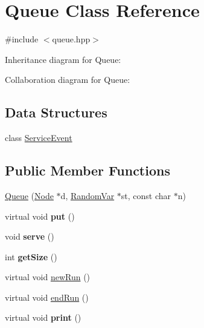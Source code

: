 \hypertarget{classQueue}{}\section{Queue Class Reference}
\label{classQueue}


{\ttfamily \#include $<$queue.\+hpp$>$}



Inheritance diagram for Queue\+:


Collaboration diagram for Queue\+:
\subsection*{Data Structures}
\begin{DoxyCompactItemize}
\item 
class \hyperlink{classQueue_1_1ServiceEvent}{Service\+Event}
\end{DoxyCompactItemize}
\subsection*{Public Member Functions}
\begin{DoxyCompactItemize}
\item 
\hyperlink{classQueue_af54e6980b551beb25f143a6af173c4e6}{Queue} (\hyperlink{classNode}{Node} $\ast$d, \hyperlink{classMetaSim_1_1RandomVar}{Random\+Var} $\ast$st, const char $\ast$n)
\item 
virtual void {\bfseries put} ()\hypertarget{classQueue_a1af2272f9ece82bf8070b6c63f115923}{}\label{classQueue_a1af2272f9ece82bf8070b6c63f115923}

\item 
void {\bfseries serve} ()\hypertarget{classQueue_acb86f5bd0f0d33af376e3556e599720c}{}\label{classQueue_acb86f5bd0f0d33af376e3556e599720c}

\item 
int {\bfseries get\+Size} ()\hypertarget{classQueue_a226bb0fb50c83b9c66187a621d620895}{}\label{classQueue_a226bb0fb50c83b9c66187a621d620895}

\item 
virtual void \hyperlink{classQueue_a130518a0de553ebf8c9f06b838a818ae}{new\+Run} ()
\item 
virtual void \hyperlink{classQueue_ad197c6eafd8e04ae2c55aae7efde138b}{end\+Run} ()
\item 
virtual void {\bfseries print} ()\hypertarget{classQueue_af3d97ee62b1f354f9f350efe4a36915b}{}\label{classQueue_af3d97ee62b1f354f9f350efe4a36915b}

\end{DoxyCompactItemize}
